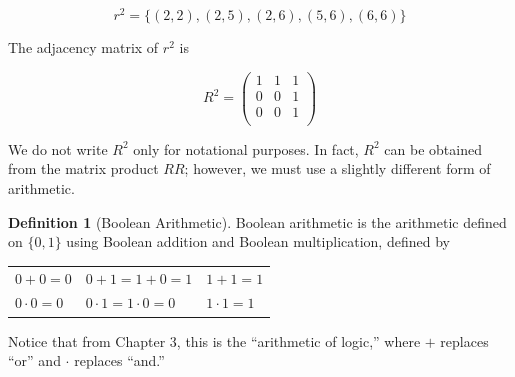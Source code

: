 \documentclass[10pt,]{book}
\theoremstyle{plain}
\theoremstyle{definition}
\newtheorem{definition}[theorem]{Definition}
\theoremstyle{definition}
\theoremstyle{definition}
\theoremstyle{definition}
\begin{document}
\begin{equation*}r^2 = \{(2, 2), (2, 5), (2, 6), (5, 6), (6, 6)\}\end{equation*}

The adjacency matrix of \(r^2\) is

\begin{equation*}R^2 =\left(
\begin{array}{ccc}
 1 & 1 & 1 \\
 0 & 0 & 1 \\
 0 & 0 & 1 \\
\end{array}
\right)\end{equation*}%
\par
We do not write \(R^2\) only for notational purposes. In fact, \(R^2\) can be obtained from the matrix product \(R R\); however, we must use a slightly different form of arithmetic.%
\begin{definition}[Boolean Arithmetic]\label{def-boolean-arithmetic}
Boolean arithmetic is the arithmetic defined on \(\{0,1\}\) using Boolean addition and Boolean multiplication, defined by%
\leavevmode%
\begin{table}
\centering
\begin{tabular}{lll}
\(0 + 0 = 0\)&\(0+1 = 1 + 0=1\)     &\(1 + 1 = 1\)\tabularnewline[0pt]
\(0\cdot 0=0\) & \(0 \cdot  1 = 1 \cdot  0 = 0\)&\(1 \cdot  1 = 1\)
\end{tabular}
\end{table}
\end{definition}
\par
Notice that from Chapter 3, this is the ``arithmetic of logic,'' where \(+\) replaces ``or'' and \(\cdot\) replaces ``and.''%
\end{document}
